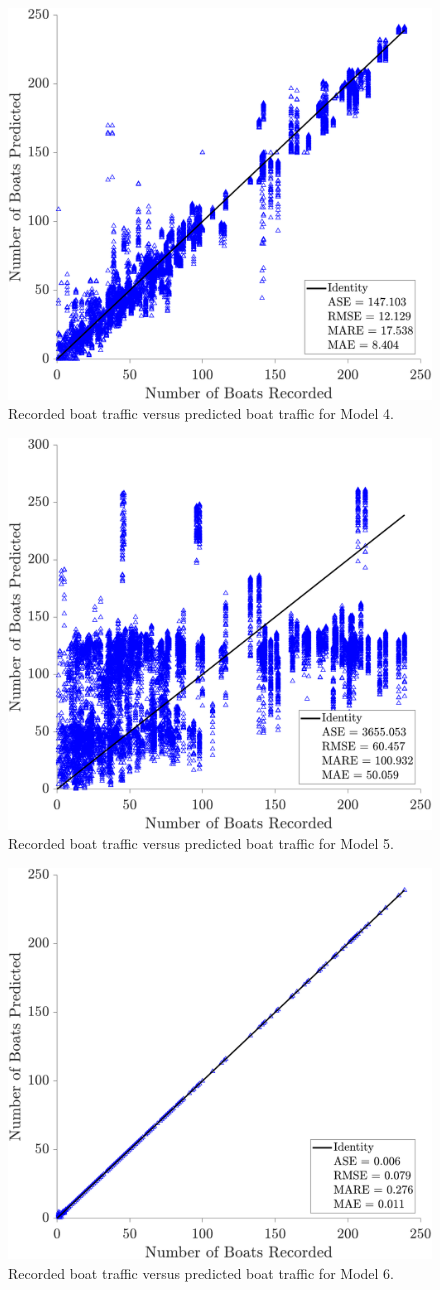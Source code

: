 \documentclass[
10pt, %
letterpaper, %
twoside, %
headinclude,footinclude, %
BCOR5mm, %
]{scrartcl}
\begin{document}
%
\begin{figure}
	\centering
	\includegraphics[width=0.65\linewidth]{figures/21-15-1.pdf}
	\caption{Recorded boat traffic versus predicted boat traffic for Model 4.} 
	\label{fig:MOD4}
\end{figure}
%
\begin{figure}
	\centering
	\includegraphics[width=0.65\linewidth]{figures/8-10-1.pdf}
	\caption{Recorded boat traffic versus predicted boat traffic for Model 5.} 
	\label{fig:MOD5}
\end{figure}
%
\begin{figure}
	\centering
	\includegraphics[width=0.65\linewidth]{figures/55-15-1.pdf}
	\caption{Recorded boat traffic versus predicted boat traffic for Model 6.} 
	\label{fig:MOD6}
\end{figure}
\end{document}

